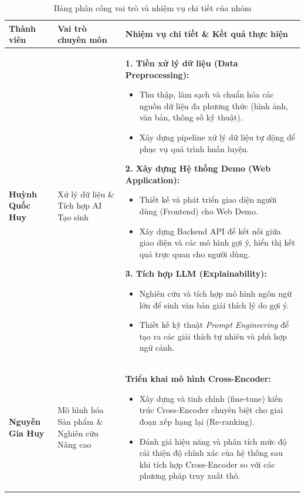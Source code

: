 \begin{table}[h!]
    \centering
    \renewcommand{\arraystretch}{1.5} %
    \caption{Bảng phân công vai trò và nhiệm vụ chi tiết của nhóm}
    \label{tab:team_assignment}
    
    \begin{tabularx}{\textwidth}{@{} p{2.5cm} p{4cm} X @{}}
    \toprule
    \textbf{Thành viên} & \textbf{Vai trò chuyên môn} & \textbf{Nhiệm vụ chi tiết \& Kết quả thực hiện} \\ 
    \midrule
    
    \textbf{Huỳnh Quốc Huy} 
    & Xử lý dữ liệu \& Tích hợp AI Tạo sinh 
    & 
    \textbf{1. Tiền xử lý dữ liệu (Data Preprocessing):}
    \begin{itemize}[leftmargin=*, nosep, after=\vspace{0.3em}]
        \item Thu thập, làm sạch và chuẩn hóa các nguồn dữ liệu đa phương thức (hình ảnh, văn bản, thông số kỹ thuật).
        \item Xây dựng pipeline xử lý dữ liệu tự động để phục vụ quá trình huấn luyện.
    \end{itemize}
    \textbf{2. Xây dựng Hệ thống Demo (Web Application):}
    \begin{itemize}[leftmargin=*, nosep]
        \item Thiết kế và phát triển giao diện người dùng (Frontend) cho Web Demo.
        \item Xây dựng Backend API để kết nối giữa giao diện và các mô hình gợi ý, hiển thị kết quả trực quan cho người dùng.
    \end{itemize}
    \textbf{3. Tích hợp LLM (Explainability):}
    \begin{itemize}[leftmargin=*, nosep]
        \item Nghiên cứu và tích hợp mô hình ngôn ngữ lớn để sinh văn bản giải thích lý do gợi ý.
        \item Thiết kế kỹ thuật \textit{Prompt Engineering} để tạo ra các giải thích tự nhiên và phù hợp ngữ cảnh.
    \end{itemize}
    \\ \midrule
    
    \textbf{Nguyễn Gia Huy} 
    & Mô hình hóa Sản phẩm \& Nghiên cứu Nâng cao 
    & 
    \textbf{Triển khai mô hình Cross-Encoder:}
    \begin{itemize}[leftmargin=*, nosep]
        \item Xây dựng và tinh chỉnh (fine-tune) kiến trúc Cross-Encoder chuyên biệt cho giai đoạn xếp hạng lại (Re-ranking).
        \item Đánh giá hiệu năng và phân tích mức độ cải thiện độ chính xác của hệ thống sau khi tích hợp Cross-Encoder so với các phương pháp truy xuất thô.
    \end{itemize}
    \\ \midrule
    

\end{tabularx}
\end{table}
